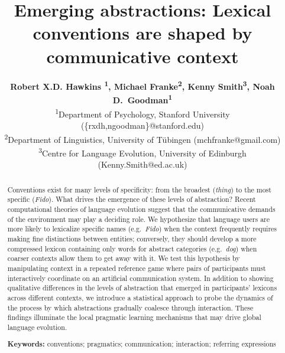 \documentclass[10pt,letterpaper]{article}
\title{Emerging abstractions: Lexical conventions are shaped by communicative context}
\author{{\large \bf Robert X.D. Hawkins \textsuperscript{1}, Michael Franke\textsuperscript{2}, Kenny Smith\textsuperscript{3}, Noah D.~Goodman\textsuperscript{1}} \\
   \textsuperscript{1}Department of Psychology, Stanford University (\{rxdh,ngoodman\}@stanford.edu) \\
  \textsuperscript{2}Department of Linguistics, University of T\"ubingen (mchfranke@gmail.com)\\
  \textsuperscript{3}Centre for Language Evolution, University of Edinburgh (Kenny.Smith@ed.ac.uk)}
\newcommand{\mf}[1]{\textcolor{Red}{[ndg: #1]}}
\begin{document}
\maketitle



\begin{abstract}
Conventions exist for many levels of specificity: from the broadest (\emph{thing}) to the most specific (\emph{Fido}). What drives the emergence of these levels of abstraction? Recent computational theories of language evolution suggest that the communicative demands of the environment may play a deciding role. We hypothesize that language users are more likely to lexicalize specific names (e.g.\ \emph{Fido}) when the context frequently requires making fine distinctions between entities; conversely, they should develop a more compressed lexicon containing only words for abstract categories (e.g.\ \emph{dog}) when coarser contexts allow them to get away with it. We test this hypothesis by manipulating context in a repeated reference game where pairs of participants must interactively coordinate on an artificial communication system. In addition to showing qualitative differences in the levels of abstraction that emerged in participants' lexicons across different contexts, we introduce a statistical approach to probe the dynamics of the process by which abstractions gradually coalesce through interaction. These findings illuminate the local pragmatic learning mechanisms that may drive global language evolution.

\textbf{Keywords:}
conventions; pragmatics; communication; interaction; referring expressions

\end{abstract}
\end{document}
